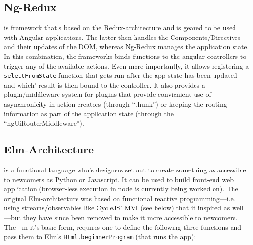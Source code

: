\subsection{Ng-Redux}\label{ref:ng-redux}

 is framework that's based on the Redux-architecture and is geared to be used with Angular applications. The latter then handles the Components/Directives and their updates of the DOM, whereas Ng-Redux manages the application state. In this combination, the frameworks binds functions to the angular controllers to trigger any of the available actions. Even more importantly, it allows registering a \texttt{selectFromState}-function that gets run after
the app-state has been updated and which' result is then bound to the controller. It also provides a plugin/middleware-system for plugins that provide convienient use of asynchronicity in action-creators (through ``thunk'') or keeping the routing information as part of the application state (through the ``ngUiRouterMiddleware'').

\subsection{Elm-Architecture}

 is a functional language who's designers set out to create something as accessible to newcomers as Python or Javascript. It can be used to build front-end web application (browser-less execution in node is currently being worked on). The original Elm-architecture was based on functional reactive programming---i.e. using streams/observables like CycleJS' MVI (see below) that it inspired as well---but they have since been removed to make it more accessible to
newcomers. The , in it's basic form, requires one to define the following three functions and pass them to Elm's \texttt{Html.beginnerProgram} (that runs the app):


